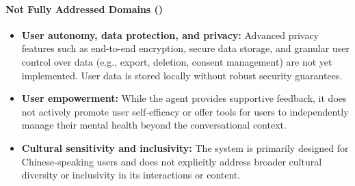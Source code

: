 \paragraph{Not Fully Addressed Domains (\xmark)}
\begin{itemize}
    \item \textbf{User autonomy, data protection, and privacy:} Advanced privacy features such as end-to-end encryption, secure data storage, and granular user control over data (e.g., export, deletion, consent management) are not yet implemented. User data is stored locally without robust security guarantees.
    \item \textbf{User empowerment:} While the agent provides supportive feedback, it does not actively promote user self-efficacy or offer tools for users to independently manage their mental health beyond the conversational context.
    \item \textbf{Cultural sensitivity and inclusivity:} The system is primarily designed for Chinese-speaking users and does not explicitly address broader cultural diversity or inclusivity in its interactions or content.
\end{itemize}

